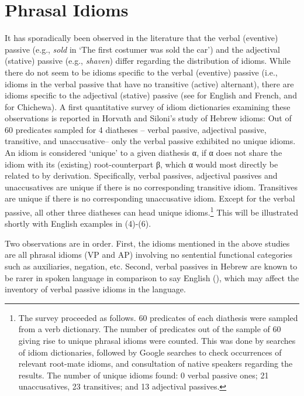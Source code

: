 \documentclass[output=paper,
modfonts
]{LSP/langsci}
\begin{document}
\section{Phrasal Idioms }

It has sporadically been observed in the literature that the verbal
(eventive) passive (e.g., \emph{sold} in `The first costumer was sold
the car') and the adjectival (stative) passive (e.g., \emph{shaven})
differ regarding the distribution of idioms. While there do not seem to
be idioms specific to the verbal (eventive) passive (i.e., idioms in the
verbal passive that have no transitive (active) alternant), there are
idioms specific to the adjectival (stative) passive (see \citealt{ruwet1991} for
English and French, and  \citealt{dubinsky1996} for Chichewa). A first
quantitative survey of idiom dictionaries examining these observations
is reported in Horvath and Siloni's \citeyear{horvath2009} study of Hebrew idioms: Out
of 60 predicates sampled for 4 diatheses -- verbal passive, adjectival
passive, transitive, and unaccusative-- only the verbal passive
exhibited no unique idioms. An idiom is considered `unique' to a given
diathesis α, if α does not share the idiom with its (existing)
root-counterpart β, which α would most directly be related to by
derivation. Specifically, verbal passives, adjectival passives and
unaccusatives are unique if there is no corresponding transitive idiom.
Transitives are unique if there is no corresponding unaccusative idiom.
Except for the verbal passive, all other three diatheses can head unique
idioms.\footnote{The survey proceeded as follows. 60 predicates of each
  diathesis were sampled from a verb dictionary. The number of
  predicates out of the sample of 60 giving rise to unique phrasal
  idioms were counted. This was done by searches of idiom dictionaries,
  followed by Google searches to check occurrences of relevant root-mate
  idioms, and consultation of native speakers regarding the results. The
  number of unique idioms found: 0 verbal passive ones; 21
  unaccusatives, 23 transitives; and 13 adjectival passives.} This will
be illustrated shortly with English examples in (4)-(6).

Two observations are in order. First, the idioms mentioned in the above
studies are all phrasal idioms (VP and AP) involving no sentential
functional categories such as auxiliaries, negation, etc. Second, verbal
passives in Hebrew are known to be rarer in spoken language in
comparison to say English (\citealt{berman2008}), which may affect the inventory
of verbal passive idioms in the language.
\end{document}
